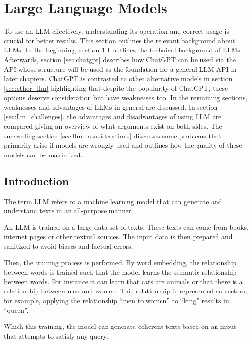 \section{Large Language Models}\label{sec:llm}

To use an \ac{LLM} effectively, understanding its operation and correct usage is crucial for better results. This section outlines the relevant background about \acp{LLM}. In the beginning, section \ref{sec:llm_introduction} outlines the technical background of \acp{LLM}. Afterwards, section  \ref{sec:chatgpt}  describes how ChatGPT can be used via the \ac{API} whose structure will be used as the foundation for a general \ac{LLM}-\ac{API} in later chapters. ChatGPT is contrasted to other alternative models in section \ref{sec:other_llm} highlighting that despite the popularity of ChatGPT, these options deserve consideration but have weaknesses too. In the remaining sections, weaknesses and advantages of \acp{LLM} in general are discussed. In section \ref{sec:llm_challenges}, the advantages and disadvantages of using \ac{LLM} are compared giving an overview of what arguments exist on both sides. The succeeding section \ref{sec:llm_considerations} discusses some problems that primarily arise if models are wrongly used and outlines how the quality of these models can be maximized. 


\subsection{Introduction}\label{sec:llm_introduction}
The term \ac{LLM} refers to a machine learning model that can generate and understand texts in an all-purpose manner. 

An \ac{LLM} is trained on a large data set of texts. These texts can come from books, internet pages or other textual sources. The input data is then prepared and sanitized to avoid biases and factual errors.


Then, the training process is performed. By word embedding, the relationship between words is trained such that the model learns the semantic relationship between words. For instance it can learn that cats are animals  or that there is a relationship between men and women. This relationship is represented as vectors; for example, applying the relationship \enquote{men to women} to \enquote{king} results in \enquote{queen}.

Which this training, the model can generate coherent texts based on an input that attempts to satisfy any query.



